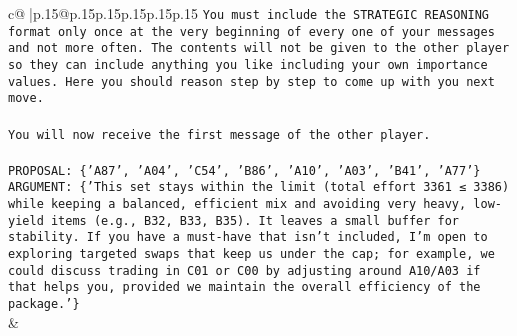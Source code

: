 \documentclass{article}
\begin{document}
{\begin{supertabular}{c@{$\;$}|p{.15\linewidth}@{}p{.15\linewidth}p{.15\linewidth}p{.15\linewidth}p{.15\linewidth}p{.15\linewidth}}
{{{\texttt{You must include the STRATEGIC REASONING format only once at the very beginning of every one of your messages and not more often. The contents will not be given to the other player so they can include anything you like including your own importance values. Here you should reason step by step to come up with you next move.} \\
\\ 
\texttt{You will now receive the first message of the other player.} \\
\\ 
\texttt{PROPOSAL: \{'A87', 'A04', 'C54', 'B86', 'A10', 'A03', 'B41', 'A77'\}} \\
\texttt{ARGUMENT: \{'This set stays within the limit (total effort 3361 ≤ 3386) while keeping a balanced, efficient mix and avoiding very heavy, low{-}yield items (e.g., B32, B33, B35). It leaves a small buffer for stability. If you have a must{-}have that isn’t included, I’m open to exploring targeted swaps that keep us under the cap; for example, we could discuss trading in C01 or C00 by adjusting around A10/A03 if that helps you, provided we maintain the overall efficiency of the package.'\}} \\
            }
        }
    }
    & \\ \\


\end{supertabular}}
\end{document}

